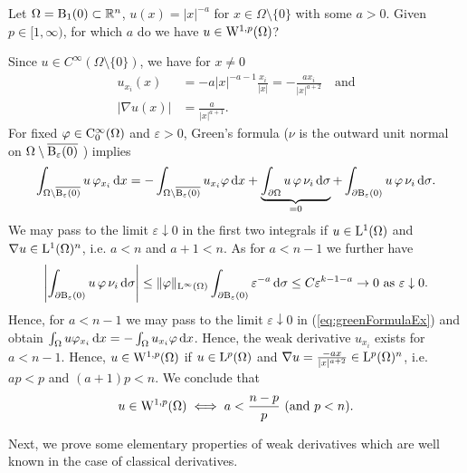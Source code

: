 \begin{ex}
  Let $\Omega = \mathrm{B}_1(0) \subset \mathbb{R}^n$, $u(x) = |x|^{-a}$ for $x \in \Omega \setminus \{0\}$ with some $a > 0$.
  Given $p \in [1,\infty)$, for which $a$ do we have $u \in \mathrm{W}^{1,p}(\Omega)$?

    Since $u \in C^\infty(\Omega \setminus \{0\})$, we have for $x \neq 0$
    \begin{align*}
      u_{x_i}(x) &= -a|x|^{-a-1} \frac{x_i}{|x|} = -\frac{ax_i}{|x|^{a + 2}} \quad \text{and} \\
      |\nabla u(x)| &= \frac{a}{|x|^{a + 1}}.
    \end{align*}
    For fixed $\varphi \in \mathrm{C}_0^\infty(\Omega)$ and $\varepsilon > 0$, Green's formula ($\nu$ is the outward unit normal on $\Omega \setminus \overline{\mathrm{B}_\varepsilon(0)}$ ) implies
    \begin{equation}
      \label{eq:greenFormulaEx}
      \int_{\Omega \setminus \overline{\mathrm{B}_\varepsilon(0)}} u \, \varphi_{x_i} \, {\operatorname{d}\!{x}}
      = -\int_{\Omega \setminus \overline{\mathrm{B}_\varepsilon(0)}} u_{x_i} \varphi \, {\operatorname{d}\!{x}} + \underbrace{\int_{\partial \Omega} u \, \varphi \, \nu_i \, {\operatorname{d}\!{\sigma}}}_{= 0}
      + \int_{\partial \mathrm{B}_\varepsilon(0)} u \, \varphi \, \nu_i \, {\operatorname{d}\!{\sigma}}.
    \end{equation}
    We may pass to the limit $\varepsilon \downarrow 0$ in the first two integrals if $u \in \mathrm{L}^1(\Omega)$ and $\nabla u \in \mathrm{L}^1(\Omega)^n$, i.e. $a < n$ and $a + 1 < n$.
    As for $a < n - 1$ we further have
    $$
    \left| \int_{\partial \mathrm{B}_\varepsilon(0)} u \, \varphi \,  \nu_i \, {\operatorname{d}\!{\sigma}} \right|
      \leq \|\varphi\|_{\mathrm{L}^\infty(\Omega)} \int_{\partial \mathrm{B}_\varepsilon(0)} \varepsilon^{-a} \, {\operatorname{d}\!{\sigma}}
      \leq C \varepsilon^{k - 1 - a} \to 0 \text{ as } \varepsilon \downarrow 0.
    $$
    Hence, for $a < n - 1$ we may pass to the limit $\varepsilon \downarrow 0$ in (\ref{eq:greenFormulaEx}) and obtain $\int_\Omega u\varphi_{x_i} \, {\operatorname{d}\!{x}} = - \int_\Omega u_{x_i} \varphi \, {\operatorname{d}\!{x}}$.
    Hence, the weak derivative $u_{x_i}$ exists for $a < n - 1$.
    Hence, $u \in \mathrm{W}^{1,p}(\Omega)$ if $u \in \mathrm{L}^p(\Omega)$ and $\nabla u = \frac{-a x}{|x|^{a + 2}} \in \mathrm{L}^p(\Omega)^n$, i.e. $ap < p$ and $(a + 1)p < n$.
    We conclude that
    $$
    u \in \mathrm{W}^{1,p}(\Omega) \iff a < \frac{n - p}{p} \text{ (and $p < n$)}.
    $$
\end{ex}

Next, we prove some elementary properties of weak derivatives which are well known in the case of classical derivatives.

